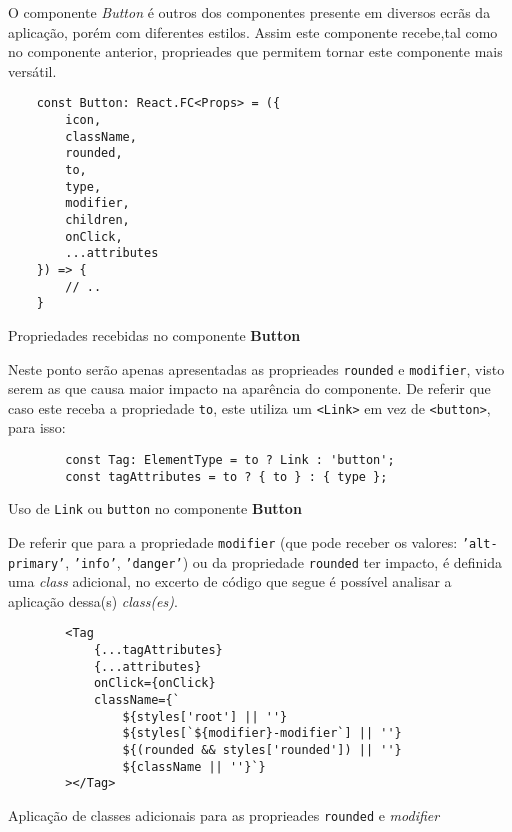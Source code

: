 
O componente \textit{Button} é outros dos componentes presente em diversos ecrãs da aplicação, porém com diferentes estilos. Assim este componente recebe,tal como no componente anterior, proprieades que permitem tornar este componente mais versátil.

\begin{longlisting}
	\begin{verbatim}
	const Button: React.FC<Props> = ({
		icon,
		className,
		rounded,
		to,
		type,
		modifier,
		children,
		onClick,
		...attributes
	}) => {
		// ..
	}
	\end{verbatim}
	\caption{Propriedades recebidas no componente \textbf{Button}}
\end{longlisting}

Neste ponto serão apenas apresentadas as proprieades \texttt{rounded} e \texttt{modifier}, visto serem as que causa maior impacto na aparência do componente. De referir que caso este receba a propriedade \texttt{to}, este utiliza um \verb|<Link>| em vez de \verb|<button>|, para isso:

\begin{longlisting}
	\begin{verbatim}
		const Tag: ElementType = to ? Link : 'button';
		const tagAttributes = to ? { to } : { type };
	\end{verbatim}
	\caption{Uso de \texttt{Link} ou \texttt{button} no componente \textbf{Button}}
\end{longlisting}

De referir que para a propriedade \texttt{modifier} (que pode receber os valores: \texttt{'alt-primary'}, \texttt{'info'}, \texttt{'danger'}) ou da propriedade \texttt{rounded} ter impacto, é definida uma \textit{class} \textbf{} adicional, no excerto de código que segue é possível analisar a aplicação dessa(s) \textit{class(es)}.

\begin{longlisting}
	\begin{verbatim}
		<Tag
			{...tagAttributes}
			{...attributes}
			onClick={onClick}
			className={`
				${styles['root'] || ''}
				${styles[`${modifier}-modifier`] || ''}
				${(rounded && styles['rounded']) || ''}
				${className || ''}`}
		></Tag>
	\end{verbatim}
	\caption{Aplicação de classes adicionais para as proprieades \texttt{rounded} e \textit{modifier}}
\end{longlisting}

